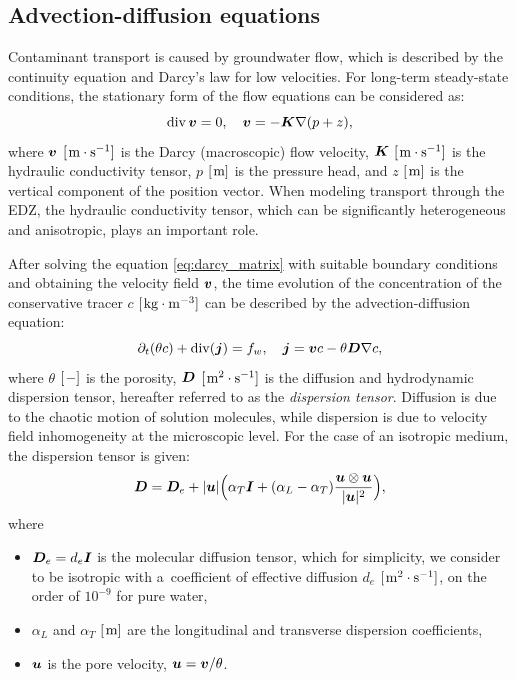 \subsection{Advection-diffusion equations}
Contaminant transport is caused by groundwater flow, which is described by the
continuity equation and Darcy's law for low velocities. For long-term
steady-state conditions, the stationary form of the flow equations can be
considered as:
\begin{equation}
    \label{eq:darcy_matrix}
    \mathop{\mathrm{div}}\nolimits {\bm{v}} = 0, \quad {\bm{v}} = -{\bm{K}} \nabla (p + z),
\end{equation}
where ${\bm{v}}$ $[\hspace{1pt}\mathrm{m\cdot s^{-1}}]$ is the Darcy (macroscopic) flow
velocity, ${\bm{K}}$ $[\hspace{1pt}\mathrm{m\cdot s^{-1}}]$ is the hydraulic conductivity tensor,
$p$ $[\hspace{1pt}\mathrm{m}]$ is the pressure head, and $z$ $[\hspace{1pt}\mathrm{m}]$ is the vertical
component of the position vector. When modeling transport through the EDZ, the
hydraulic conductivity tensor, which can be significantly heterogeneous and
anisotropic, plays an important role.

After solving the equation \eqref{eq:darcy_matrix} with suitable boundary
conditions and obtaining the velocity field ${\bm{v}}$, the time evolution of the
concentration of the conservative tracer $c$ $[\hspace{1pt}\mathrm{kg\cdot m^{-3}}]$ can be
described by the advection-diffusion equation:
\begin{equation}
   \label{eq:transport_matrix}
   \partial_t (\theta c) + \mathop{\mathrm{div}}\nolimits({\bm{j}}) = f_w,\quad
   {\bm{j}} = {\bm{v}} c - \theta {\bm{D}} \nabla c,
\end{equation}
where $\theta$ $[\hspace{1pt}\mathrm{-}]$ is the porosity, ${\bm{D}}$ $[\hspace{1pt}\mathrm{m^2\cdot s^{-1}}]$
is the diffusion and hydrodynamic dispersion tensor, hereafter referred to as
the {\it dispersion tensor}. Diffusion is due to the chaotic motion of solution
molecules, while dispersion is due to velocity field inhomogeneity at the
microscopic level.
For the case of an isotropic medium, the dispersion tensor is given:
\begin{equation}
  \label{eq:dispersion_tn}
  {\bm{D}} = {\bm{D}}_e + |{\bm{u}}|\Big(\alpha_T {\bm{I}} + (\alpha_L - \alpha_T)\frac{{\bm{u}} \otimes {\bm{u}}}{|{\bm{u}}|^2}\Big),
\end{equation}
where
\begin{itemize}
 \item ${\bm{D}}_e = d_e {\bm{I}}$ is the molecular diffusion tensor, which for
 simplicity, we consider to be isotropic with a~coefficient of effective
 diffusion $d_e$ $[\hspace{1pt}\mathrm{m^2\cdot s^{-1}}]$, on the order of $10^{-9}$ for pure
 water,
 \item $\alpha_L$ and $\alpha_T$ $[\hspace{1pt}\mathrm{m}]$ are the longitudinal and
 transverse dispersion coefficients,
 \item ${\bm{u}}$ is the pore velocity, ${\bm{u}} = {\bm{v}} / \theta$.
\end{itemize}

